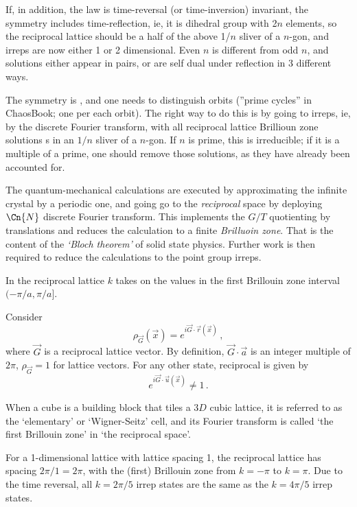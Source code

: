 If, in addition, the law is time-reversal (or time-inversion) invariant,
the symmetry includes time-reflection, ie, it is dihedral group 
with 2$n$ elements, so the reciprocal lattice should be a half of the
above 1/$n$ sliver of a $n$-gon, and irreps are now either 1 or 2
dimensional. Even $n$ is different from odd $n$, and solutions either appear
in pairs, or are self dual under reflection in 3 different ways.

The symmetry is
, and one needs to distinguish  orbits
(''{prime cycle}s'' in ChaosBook; one per each orbit).
The right way to do this is by going to
 irreps, ie, by the discrete Fourier transform, with all reciprocal
lattice Brillioun zone solutions {\orbit}s in an $1/n$ sliver of a
$n$-gon. If $n$ is prime, this is irreducible; if it is a multiple of a
prime, one should remove those solutions, as they have already been
accounted for.

The quantum-mechanical calculations are executed by approximating the
infinite crystal by a periodic one, and going go to the \emph{reciprocal}
space  by deploying $\Cn{N}$ discrete Fourier transform. This implements the
$G/T$ quotienting by translations and reduces the calculation to a finite
\emph{Brilluoin zone}. That is the content of the \emph{`Bloch theorem'} of
solid state physics. Further work is then required to reduce the
calculations to the point group irreps.

In the
reciprocal lattice $k$ takes on the values in the first Brillouin zone
interval $(-\pi/a,\pi/a]$.

Consider
\[
\rho_{\vec{G}}(\vec{x})= e^{i\vec{G}\cdot\vec{r}(\vec{x})}
\,,
\]
where $\vec{G}$ is a reciprocal lattice vector. By definition,
$\vec{G}\cdot\vec{a}$ is an integer multiple of $2\pi$, $\rho_{\vec{G}}=1$ for
lattice vectors.
For any other state, reciprocal {\lattstate} is given by
\[
e^{i\vec{G}\cdot\vec{u}(\vec{x})} \neq 1
\,.
\]

When a
cube is a building block that tiles a $3D$ cubic lattice, it is referred
to as the `elementary' or `Wigner-Seitz' cell, and its Fourier transform
is called `the first Brillouin zone' in `the reciprocal space'.


For a 1-dimensional lattice with
lattice spacing 1, the reciprocal lattice has spacing $2\pi/1=2\pi$, with
the (first) Brillouin zone from $k=-\pi$ to $k=\pi$. Due to the time
reversal, all $k={2\pi}/{5}$ irrep states are the same as the
$k={4\pi}/{5}$ irrep states.

